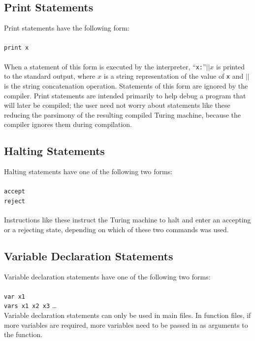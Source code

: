\documentclass[11pt]{report}
\begin{document}
\subsection{Print Statements}

Print statements have the following form: \\ \\ 
\texttt{print x} \\ \\ 
When a statement of this form is executed by the interpreter, ``\texttt{x:}''$|| x$ is printed to the standard output, where $x$ is a string representation of the value of \texttt{x} and $||$ is the string concatenation operation. Statements of this form are ignored by the compiler. Print statements are intended primarily to help debug a program that will later be compiled; the user need not worry about statements like these reducing the parsimony of the resulting compiled Turing machine, because the compiler ignores them during compilation.

\subsection{Halting Statements}

Halting statements have one of the following two forms: \\ \\
\texttt{accept} \\
\texttt{reject} \\ \\

Instructions like these instruct the Turing machine to halt and enter an accepting or a rejecting state, depending on which of these two commands was used. 

\subsection{Variable Declaration Statements}

Variable declaration statements have one of the following two forms: \\ \\
\texttt{var x1} \\
\texttt{vars x1 x2 x3} \dots \\

Variable declaration statements can only be used in main files. In function files, if more variables are required, more variables need to be passed in as arguments to the function. \\
\end{document}
